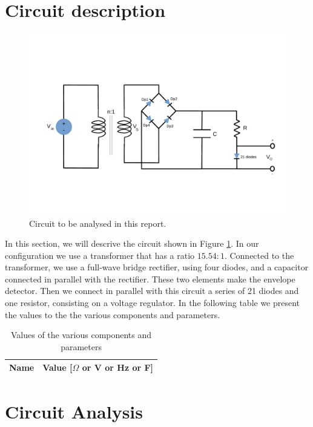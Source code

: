 \section{Circuit description}
\label{sec:analysis}

\begin{figure}[h] \centering
\includegraphics[width=1\linewidth]{../figlib/lab3.pdf}
\caption{Circuit to be analysed in this report.}
\label{fig:lab3}
\end{figure}


In this section, we will descrive the circuit shown in Figure \ref{fig:lab3}. In our configuration we use a transformer that has a ratio $15.54:1$. 
Connected to the transformer, we use a full-wave bridge rectifier, using four diodes, and a capacitor connected in parallel with the rectifier. 
These two elements make the envelope detector. Then we connect in parallel with this circuit a series of 21 diodes and one resistor, consisting on a voltage regulator. 
In the following table we present the values to the the various components and parameters.

\begin{table}[h]
  \centering
  \begin{tabular}{|l|r|}
    \hline    
    {\bf Name} & {\bf Value [{$\Omega$} or V or Hz or F]} \\ \hline
    
  \end{tabular}
  \caption{Values of the various components and parameters}
  \label{tab:Circuit}
\end{table}

\newpage
\section{Circuit Analysis}

